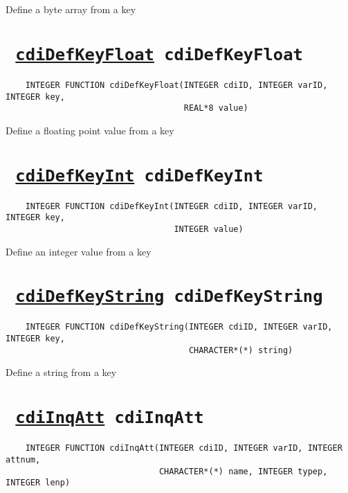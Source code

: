Define a byte array from a key
\ifpdfoutput{}{(\ref{cdiDefKeyBytes})}


\section*{\texttt{ 
\ifpdf
\hyperref[cdiDefKeyFloat]{cdiDefKeyFloat}
\else
cdiDefKeyFloat
\fi
}}
\begin{verbatim}
    INTEGER FUNCTION cdiDefKeyFloat(INTEGER cdiID, INTEGER varID, INTEGER key, 
                                    REAL*8 value)
\end{verbatim}

Define a floating point value from a key
\ifpdfoutput{}{(\ref{cdiDefKeyFloat})}


\section*{\texttt{ 
\ifpdf
\hyperref[cdiDefKeyInt]{cdiDefKeyInt}
\else
cdiDefKeyInt
\fi
}}
\begin{verbatim}
    INTEGER FUNCTION cdiDefKeyInt(INTEGER cdiID, INTEGER varID, INTEGER key, 
                                  INTEGER value)
\end{verbatim}

Define an integer value from a key
\ifpdfoutput{}{(\ref{cdiDefKeyInt})}


\section*{\texttt{ 
\ifpdf
\hyperref[cdiDefKeyString]{cdiDefKeyString}
\else
cdiDefKeyString
\fi
}}
\begin{verbatim}
    INTEGER FUNCTION cdiDefKeyString(INTEGER cdiID, INTEGER varID, INTEGER key, 
                                     CHARACTER*(*) string)
\end{verbatim}

Define a string from a key
\ifpdfoutput{}{(\ref{cdiDefKeyString})}


\section*{\texttt{ 
\ifpdf
\hyperref[cdiInqAtt]{cdiInqAtt}
\else
cdiInqAtt
\fi
}}
\begin{verbatim}
    INTEGER FUNCTION cdiInqAtt(INTEGER cdiID, INTEGER varID, INTEGER attnum, 
                               CHARACTER*(*) name, INTEGER typep, INTEGER lenp)
\end{verbatim}

